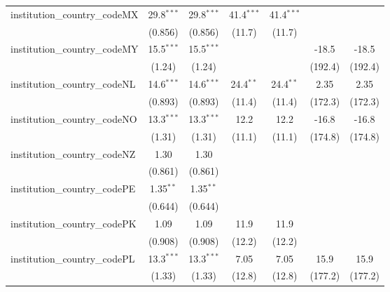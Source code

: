 \begin{tabular}{lcccccc}
   institution\_country\_codeMX          & 29.8$^{***}$  & 29.8$^{***}$  & 41.4$^{***}$  & 41.4$^{***}$  &               &   \\   
                                         & (0.856)       & (0.856)       & (11.7)        & (11.7)        &               &   \\   
   institution\_country\_codeMY          & 15.5$^{***}$  & 15.5$^{***}$  &               &               & -18.5         & -18.5\\   
                                         & (1.24)        & (1.24)        &               &               & (192.4)       & (192.4)\\   
   institution\_country\_codeNL          & 14.6$^{***}$  & 14.6$^{***}$  & 24.4$^{**}$   & 24.4$^{**}$   & 2.35          & 2.35\\   
                                         & (0.893)       & (0.893)       & (11.4)        & (11.4)        & (172.3)       & (172.3)\\   
   institution\_country\_codeNO          & 13.3$^{***}$  & 13.3$^{***}$  & 12.2          & 12.2          & -16.8         & -16.8\\   
                                         & (1.31)        & (1.31)        & (11.1)        & (11.1)        & (174.8)       & (174.8)\\   
   institution\_country\_codeNZ          & 1.30          & 1.30          &               &               &               &   \\   
                                         & (0.861)       & (0.861)       &               &               &               &   \\   
   institution\_country\_codePE          & 1.35$^{**}$   & 1.35$^{**}$   &               &               &               &   \\   
                                         & (0.644)       & (0.644)       &               &               &               &   \\   
   institution\_country\_codePK          & 1.09          & 1.09          & 11.9          & 11.9          &               &   \\   
                                         & (0.908)       & (0.908)       & (12.2)        & (12.2)        &               &   \\   
   institution\_country\_codePL          & 13.3$^{***}$  & 13.3$^{***}$  & 7.05          & 7.05          & 15.9          & 15.9\\   
                                         & (1.33)        & (1.33)        & (12.8)        & (12.8)        & (177.2)       & (177.2)\\   

\end{tabular}
